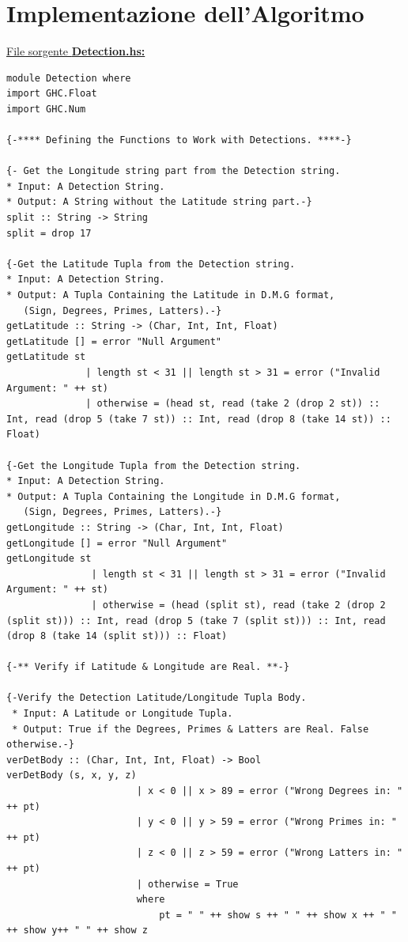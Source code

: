 \documentclass{article}
\begin{document}
\section{Implementazione dell'Algoritmo}
\raggedright
\underline{File sorgente \textbf{Detection.hs:}}
\lstset{language=Haskell}
\begin{lstlisting}
module Detection where
import GHC.Float
import GHC.Num

{-**** Defining the Functions to Work with Detections. ****-}
            
{- Get the Longitude string part from the Detection string.
* Input: A Detection String.
* Output: A String without the Latitude string part.-}
split :: String -> String
split = drop 17 

{-Get the Latitude Tupla from the Detection string.
* Input: A Detection String.
* Output: A Tupla Containing the Latitude in D.M.G format,
   (Sign, Degrees, Primes, Latters).-}
getLatitude :: String -> (Char, Int, Int, Float)
getLatitude [] = error "Null Argument"
getLatitude st
              | length st < 31 || length st > 31 = error ("Invalid Argument: " ++ st)
              | otherwise = (head st, read (take 2 (drop 2 st)) :: Int, read (drop 5 (take 7 st)) :: Int, read (drop 8 (take 14 st)) :: Float)

{-Get the Longitude Tupla from the Detection string.
* Input: A Detection String.
* Output: A Tupla Containing the Longitude in D.M.G format,
   (Sign, Degrees, Primes, Latters).-}
getLongitude :: String -> (Char, Int, Int, Float)
getLongitude [] = error "Null Argument"
getLongitude st
               | length st < 31 || length st > 31 = error ("Invalid Argument: " ++ st)
               | otherwise = (head (split st), read (take 2 (drop 2 (split st))) :: Int, read (drop 5 (take 7 (split st))) :: Int, read (drop 8 (take 14 (split st))) :: Float)

{-** Verify if Latitude & Longitude are Real. **-}

{-Verify the Detection Latitude/Longitude Tupla Body.
 * Input: A Latitude or Longitude Tupla.
 * Output: True if the Degrees, Primes & Latters are Real. False otherwise.-}
verDetBody :: (Char, Int, Int, Float) -> Bool
verDetBody (s, x, y, z)
                       | x < 0 || x > 89 = error ("Wrong Degrees in: " ++ pt)
                       | y < 0 || y > 59 = error ("Wrong Primes in: " ++ pt)
                       | z < 0 || z > 59 = error ("Wrong Latters in: " ++ pt)
                       | otherwise = True 
                       where
                           pt = " " ++ show s ++ " " ++ show x ++ " " ++ show y++ " " ++ show z


\end{lstlisting}
\end{document}
